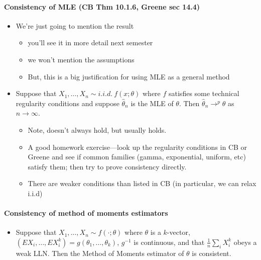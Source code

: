 \paragraph{Consistency of MLE (CB Thm 10.1.6, Greene sec 14.4)}
\label{sec-1-6-3}

\begin{itemize}
\item We're just going to mention the result
\begin{itemize}
\item you'll see it in more detail next semester
\item we won't mention the assumptions
\item But, this is a big justification for using MLE as a general method
\end{itemize}
\item Suppose that $X_1,\dots,X_n \sim i.i.d.\ f(x; \theta)$ where
        $f$ satisfies some technical regularity conditions and suppose
        $\hat\theta_n$ is the MLE of $\theta$.  Then $\hat\theta_n
        \to^p \theta$ as $n \to \infty$.
\begin{itemize}
\item Note, doesn't always hold, but usually holds.
\item A good homework exercise---look up the regularity conditions
          in CB or Greene and see if common families (gamma,
          exponential, uniform, etc) satisfy them; then try to prove consistency
          directly.
\item There are weaker conditions than listed in CB (in particular,
          we can relax i.i.d)
\end{itemize}
\end{itemize}
\paragraph{Consistency of method of moments estimators}
\label{sec-1-6-4}

\begin{itemize}
\item Suppose that $X_1,\dots,X_n \sim f(\cdot; \theta)$ where
        $\theta$ is a $k$-vector, $(E X_i,\dots,E X_i^k) =
        g(\theta_1,\dots,\theta_k)$, $g^{-1}$ is continuous, and that
        $\frac{1}{n} \sum_i X_i^k$ obeys a weak LLN.  Then the Method
        of Moments estimator of $\theta$ is consistent.
\end{itemize}

